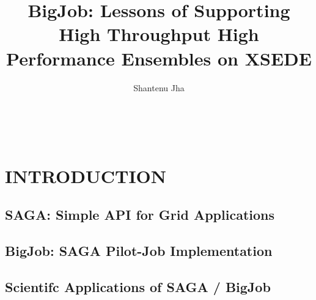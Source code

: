 \documentclass{sig-alternate}
\begin{document}
 {}
\crdata{}


\title{BigJob: Lessons of Supporting High Throughput High Performance Ensembles on XSEDE}

\author{
\alignauthor Shantenu Jha\\
      \\
     \\
      \\
}


\begin{abstract}
\end{abstract}



\section{INTRODUCTION}
\subsection{SAGA: Simple API for Grid Applications}
\subsection{BigJob: SAGA Pilot-Job Implementation}
\subsection{Scientifc Applications of SAGA / BigJob}
\end{document}
